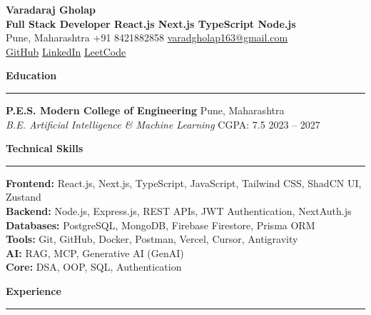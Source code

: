 \documentclass[10pt,a4paper]{article}
\newcommand{\cvsection}[1]{%
  \vspace{5pt}%
  {\large\bfseries\color{primarycolor} #1}%
  \vspace{1.5pt}\hrule\vspace{3.5pt}%
}
\begin{document}
\begin{center}
    {\fontsize{22pt}{24pt}\selectfont \textbf{\color{primarycolor} Varadaraj Gholap}}\\[3pt]
    {\normalsize \textbf{Full Stack Developer \;\textbar\; React.js \;\textbar\; Next.js \;\textbar\; TypeScript \;\textbar\; Node.js}}\\[3pt]
    {\small Pune, Maharashtra \;\textbar\; +91 8421882858 \;\textbar\; \href{mailto:varadgholap163@gmail.com}{varadgholap163@gmail.com}}\\[2pt]
    {\small \href{https://github.com/Varad163}{GitHub} \;\textbar\; \href{https://www.linkedin.com/in/varadraj-gholap-04a42228/}{LinkedIn} \;\textbar\; \href{https://leetcode.com/u/Varad163/}{LeetCode}}
\end{center}

\vspace{-4pt}

\cvsection{Education}

\textbf{P.E.S. Modern College of Engineering} \hfill Pune, Maharashtra\\
\textnormal{\textit{B.E. Artificial Intelligence \& Machine Learning} \;\textbar\; CGPA: 7.5} \hfill 2023 -- 2027

\cvsection{Technical Skills}

\begin{small}
\textbf{Frontend:} React.js, Next.js, TypeScript, JavaScript, Tailwind CSS, ShadCN UI, Zustand\\[2.5pt]
\textbf{Backend:} Node.js, Express.js, REST APIs, JWT Authentication, NextAuth.js\\[2.5pt]
\textbf{Databases:} PostgreSQL, MongoDB, Firebase Firestore, Prisma ORM\\[2.5pt]
\textbf{Tools:} Git, GitHub, Docker, Postman, Vercel, Cursor, Antigravity\\[2.5pt]
\textbf{AI:} RAG, MCP, Generative AI (GenAI)\\[2.5pt]
\textbf{Core:} DSA, OOP, SQL, Authentication
\end{small}

\cvsection{Experience}
\end{document}
